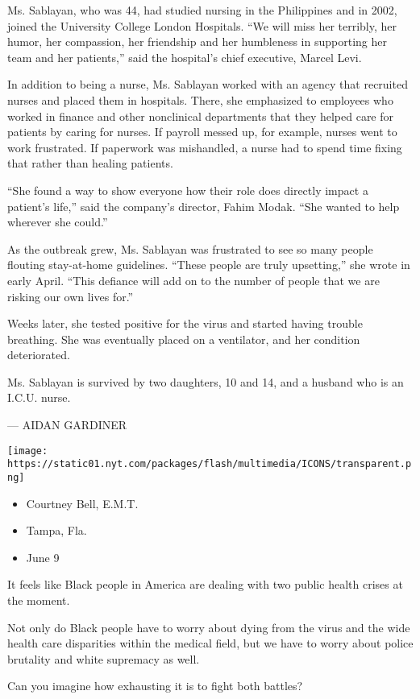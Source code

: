 Ms. Sablayan, who was 44, had studied nursing in the Philippines and in
2002, joined the University College London Hospitals. ``We will miss her
terribly, her humor, her compassion, her friendship and her humbleness
in supporting her team and her patients,'' said the hospital's chief
executive, Marcel Levi.

In addition to being a nurse, Ms. Sablayan worked with an agency that
recruited nurses and placed them in hospitals. There, she emphasized to
employees who worked in finance and other nonclinical departments that
they helped care for patients by caring for nurses. If payroll messed
up, for example, nurses went to work frustrated. If paperwork was
mishandled, a nurse had to spend time fixing that rather than healing
patients.

``She found a way to show everyone how their role does directly impact a
patient's life,'' said the company's director, Fahim Modak. ``She wanted
to help wherever she could.''

As the outbreak grew, Ms. Sablayan was frustrated to see so many people
flouting stay-at-home guidelines. ``These people are truly upsetting,''
she wrote in early April. ``This defiance will add on to the number of
people that we are risking our own lives for.''

Weeks later, she tested positive for the virus and started having
trouble breathing. She was eventually placed on a ventilator, and her
condition deteriorated.

Ms. Sablayan is survived by two daughters, 10 and 14, and a husband who
is an I.C.U. nurse.

--- AIDAN GARDINER

\texttt{[image: https://static01.nyt.com/packages/flash/multimedia/ICONS/transparent.png]}

\begin{itemize}
\tightlist
\item
  Courtney Bell, E.M.T.
\item
  Tampa, Fla.
\item
  June 9
\end{itemize}

It feels like Black people in America are dealing with two public health
crises at the moment.

Not only do Black people have to worry about dying from the virus and
the wide health care disparities within the medical field, but we have
to worry about police brutality and white supremacy as well.

Can you imagine how exhausting it is to fight both battles?

